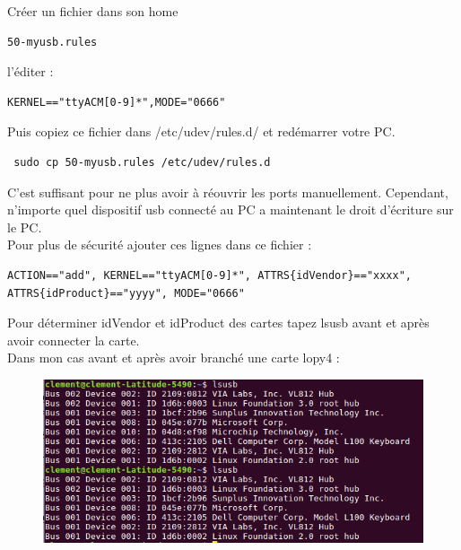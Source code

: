 \documentclass{article}
\begin{document}
Créer un fichier dans son home

\begin{verbatim}
50-myusb.rules
\end{verbatim} 

l'éditer : 

\begin{verbatim}
KERNEL=="ttyACM[0-9]*",MODE="0666"
\end{verbatim}

Puis copiez ce fichier dans /etc/udev/rules.d/ et redémarrer votre PC.\\

\begin{verbatim}
 sudo cp 50-myusb.rules /etc/udev/rules.d
\end{verbatim}
C'est suffisant pour ne plus avoir à réouvrir les ports manuellement. Cependant, n'importe quel dispositif usb connecté au PC a maintenant le droit d'écriture sur le PC. \\

Pour plus de sécurité ajouter ces lignes dans ce fichier :

\begin{verbatim}
ACTION=="add", KERNEL=="ttyACM[0-9]*", ATTRS{idVendor}=="xxxx", 
ATTRS{idProduct}=="yyyy", MODE="0666"
\end{verbatim}
 
 Pour déterminer idVendor et idProduct des cartes tapez lsusb avant et après avoir connecter la carte. \\

 Dans mon cas avant et après avoir branché une carte lopy4 :
 
 \begin{figure}[H]
\begin{center}
\advance\leftskip-3cm
\advance\rightskip-3cm
\includegraphics[keepaspectratio=true,scale=0.5]{lsusb.png}
\label{visina8}
\end{center}\end{figure}
\end{document}
